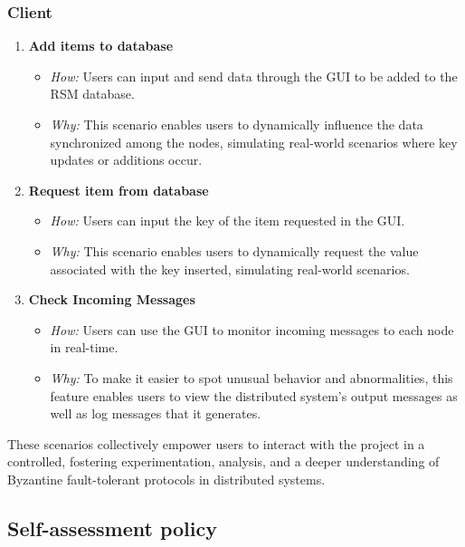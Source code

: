 \documentclass{scrartcl}
\begin{document}
\subsubsection{Client}

\begin{enumerate}
    \item \textbf{Add items to database}
        \begin{itemize}
            \item \textit{How:} Users can input and send data through the GUI to be added to the RSM database.
            \item \textit{Why:} This scenario enables users to dynamically influence the data synchronized among the nodes, simulating real-world scenarios where key updates or additions occur.
        \end{itemize}

    \item \textbf{Request item from database}
        \begin{itemize}
            \item \textit{How:} Users can input the key of the item requested in the GUI.
            \item \textit{Why:} This scenario enables users to dynamically request the value associated with the key inserted, simulating real-world scenarios.
        \end{itemize}
    \item \textbf{Check Incoming Messages}
        \begin{itemize}
            \item \textit{How:} Users can use the GUI to monitor incoming messages to each node in real-time.
            \item \textit{Why:} To make it easier to spot unusual behavior and abnormalities, this feature enables users to view the distributed system's output messages as well as log messages that it generates.
        \end{itemize}
        
\end{enumerate}

These scenarios collectively empower users to interact with the project in a controlled, fostering experimentation, analysis, and a deeper understanding of Byzantine fault-tolerant protocols in distributed systems.


\subsection{Self-assessment policy}
\end{document}

